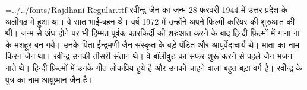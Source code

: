 
\pagewidth=210mm
\pageheight=297mm
\hsize=210mm
\hsize=190mm
\hoffset=10mm
\voffset=10mm
\nopagenumbers
\parindent=0mm
\font\raj={../../fonts/Rajdhani-Regular.ttf}
\raj
रवीन्द्र जैन का जन्म 28 फरवरी 1944 में उत्तर प्रदेश के अलीगढ़ में हुआ था। वे सात भाई-बहन थे। वर्ष 1972 में उन्होंने अपने फिल्मी करियर की शुरुआत की थी। जन्म से अंध होने पर भी हिम्मत पूर्वक कारकिर्दी की शरुआत करने के बाद हिन्दी फ़िल्मों में गाना गा के मशहूर बन गये। उनके पिता ईन्द्रमणी जैन संस्कृत के बड़े पंडित और आयुर्वेदाचार्य थे। माता का नाम किरन जैन था। रवीन्द्र उनकी तीसरी संतान थे। वे बॉलीवुड का सफर शुरू करने से पहले जैन भजन गाते थे। हिन्दी फ़िल्मों में उनके गीत लोकप्रिय हुये है और उनको चाहने वाला बहुत बड़ा वर्ग है। रवीन्द्र के पुत्र का नाम आयुष्मान जैन है।
\bye
